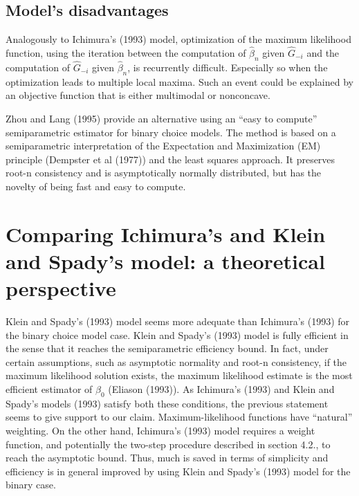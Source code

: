 \documentclass[a4paper]{article}
\begin{document}
\subsection{Model's disadvantages} %
\label{sub:Model's disadvantages}

Analogously to Ichimura's (1993) model, optimization of the maximum likelihood function, using the iteration between the computation of $\hat{\beta}_n$ given $\hat{G}_{-i}$ and the computation of $\hat{G}_{-i}$ given $\hat{\beta}_n$, is recurrently difficult.  Especially so when the optimization leads to multiple local maxima. Such an event could be explained by an objective function that is either multimodal or nonconcave. 

Zhou and Lang (1995) provide an alternative using an ``easy to compute'' semiparametric estimator for binary choice models. The method is based on a semiparametric interpretation of the Expectation and Maximization (EM) principle (Dempster et al (1977)) and the least squares approach. It preserves root-n consistency and is asymptotically normally distributed, but has the novelty of being fast and easy to compute.

\section{Comparing Ichimura's and Klein and Spady's model: a theoretical perspective} %
\label{sec:Comparing Ichimura's and Klein and Spady's model: a theoretical perspective}

Klein and Spady's (1993) model seems more adequate than Ichimura's (1993) for the binary choice model case. Klein and Spady's (1993) model is fully efficient in the sense that it reaches the semiparametric efficiency bound. In fact, under certain assumptions, such as asymptotic normality and root-n consistency, if the maximum likelihood solution exists, the maximum likelihood estimate is the most efficient estimator of $\beta_0$ (Eliason (1993)). As Ichimura's (1993) and Klein and Spady's models (1993) satisfy both these conditions, the previous statement seems to give support to our claim. Maximum-likelihood functions have ``natural'' weighting. On the other hand, Ichimura's (1993) model requires a weight function, and potentially the two-step procedure described in section 4.2., to reach the asymptotic bound. Thus, much is saved in terms of simplicity and efficiency is in general improved by using Klein and Spady's (1993) model for the binary case.
\newpage 


\end{document}
